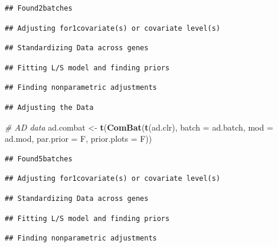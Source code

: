 \documentclass[]{book}
\newenvironment{Shaded}{\begin{snugshade}}{\end{snugshade}}
\newcommand{\KeywordTok}[1]{\textcolor[rgb]{0.13,0.29,0.53}{\textbf{#1}}}
\newcommand{\DataTypeTok}[1]{\textcolor[rgb]{0.13,0.29,0.53}{#1}}
\newcommand{\StringTok}[1]{\textcolor[rgb]{0.31,0.60,0.02}{#1}}
\newcommand{\CommentTok}[1]{\textcolor[rgb]{0.56,0.35,0.01}{\textit{#1}}}
\newcommand{\NormalTok}[1]{#1}
\begin{document}
\begin{verbatim}
## Found2batches
\end{verbatim}

\begin{verbatim}
## Adjusting for1covariate(s) or covariate level(s)
\end{verbatim}

\begin{verbatim}
## Standardizing Data across genes
\end{verbatim}

\begin{verbatim}
## Fitting L/S model and finding priors
\end{verbatim}

\begin{verbatim}
## Finding nonparametric adjustments
\end{verbatim}

\begin{verbatim}
## Adjusting the Data
\end{verbatim}

\begin{Shaded}
\begin{Highlighting}[]
\CommentTok{# AD data}
\NormalTok{ad.combat <-}\StringTok{ }\KeywordTok{t}\NormalTok{(}\KeywordTok{ComBat}\NormalTok{(}\KeywordTok{t}\NormalTok{(ad.clr), }\DataTypeTok{batch =}\NormalTok{ ad.batch, }
                      \DataTypeTok{mod =}\NormalTok{ ad.mod, }\DataTypeTok{par.prior =}\NormalTok{ F, }\DataTypeTok{prior.plots =}\NormalTok{ F))}
\end{Highlighting}
\end{Shaded}

\begin{verbatim}
## Found5batches
\end{verbatim}

\begin{verbatim}
## Adjusting for1covariate(s) or covariate level(s)
\end{verbatim}

\begin{verbatim}
## Standardizing Data across genes
\end{verbatim}

\begin{verbatim}
## Fitting L/S model and finding priors
\end{verbatim}

\begin{verbatim}
## Finding nonparametric adjustments
\end{verbatim}
\end{document}

